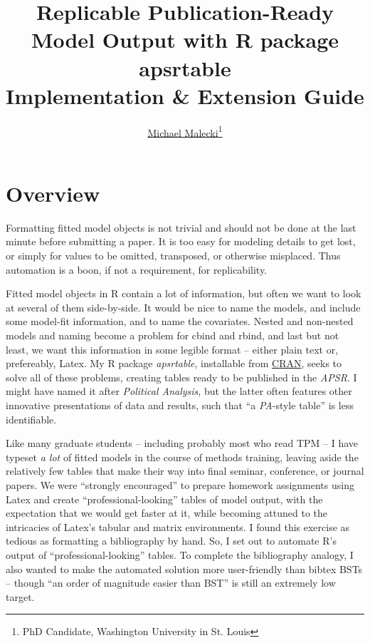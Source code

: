 \documentclass[10pt]{article} %
\begin{document}
\title{Replicable Publication-Ready Model Output with R package apsrtable\\Implementation \& Extension Guide}
\author{\href{http://malecki.wustl.edu}{Michael Malecki}\footnote{PhD Candidate, Washington University in St. Louis}}
\maketitle

\section{Overview}
\label{sec:overview}

Formatting fitted model objects is not trivial and should not be done at the last minute before submitting a paper. It is too easy for modeling details to get lost, or simply for values to be omitted, transposed, or otherwise misplaced. Thus automation is a boon, if not a requirement, for replicability.

Fitted model objects in R contain a lot of information, but often we want to look at several of them side-by-side. It would be nice to name the models, and include some model-fit information, and to name the covariates. Nested and non-nested models and naming become a problem for cbind and rbind, and last but not least, we want this information in some legible format -- either plain text or, prefereably, Latex. My R package \textit{apsrtable}, installable from \href{http://cran.r-project.org/web/packages/apsrtable/index.html}{CRAN}, seeks to solve all of these problems, creating tables ready to be published in the \textit{APSR}. I might have named it after \textit{Political Analysis}, but the latter often features other innovative presentations of data and results, such that ``a \textit{PA}-style table'' is less identifiable.

Like many graduate students -- including probably most who read TPM -- I have typeset \emph{a lot} of fitted models in the course of methods training, leaving aside the relatively few tables that make their way into final seminar, conference, or journal papers. We were ``strongly encouraged'' to prepare homework assignments using Latex and create ``professional-looking'' tables of model output, with the expectation that we would get faster at it, while becoming attuned to the intricacies of Latex's tabular and matrix environments. I found this exercise as tedious as formatting a bibliography by hand. So, I set out to automate R's output of ``professional-looking'' tables. To complete the bibliography analogy, I also wanted to make the automated solution more user-friendly than bibtex BSTs -- though ``an order of magnitude easier than BST'' is still an extremely low target.
\end{document}
